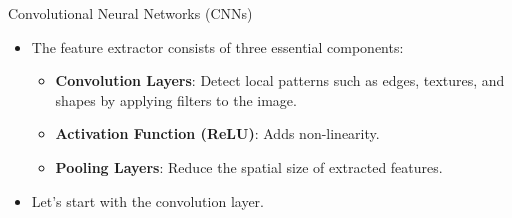 \documentclass[10pt]{beamer}
\theoremstyle{remark}
\theoremstyle{definition}
\begin{document}
\framebreak

\begin{frame}{Convolutional Neural Networks (CNNs)}
\begin{itemize}
    \item The feature extractor consists of three essential components:
    \begin{itemize}
        \item \textbf{Convolution Layers}: Detect local patterns such as edges, textures, and shapes by applying filters to the image.
        \item \textbf{Activation Function (ReLU)}: Adds non-linearity.
        \item \textbf{Pooling Layers}: Reduce the spatial size of extracted features.
    \end{itemize}
    \item Let's start with the convolution layer.
\end{itemize}

\end{frame}

\framebreak
\end{document}
